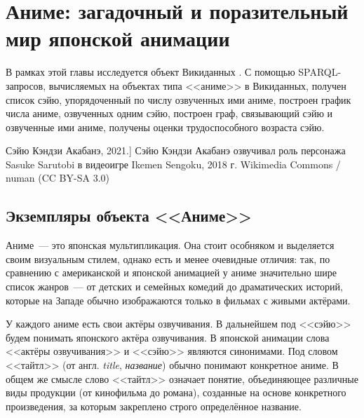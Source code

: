 
\chapter{Аниме: загадочный и поразительный мир японской анимации}


В рамках этой главы исследуется объект Викиданных . С помощью SPARQL-запросов, вычисляемых на объектах типа <<аниме>> в Викиданных, получен список сэйю, упорядоченный по числу озвученных ими аниме, построен график числа аниме, озвученных одним сэйю, построен граф, связывающий сэйю и озвученные ими аниме, получены оценки трудоспособного возраста сэйю. 

\begin{marginfigure}[0.0cm]
{
	\setlength{\fboxsep}{0pt}%
	\setlength{\fboxrule}{1pt}%
}
\caption
[Сэйю Кэндзи Акабанэ, 2021.]
{
Сэйю Кэндзи Акабанэ озвучивал роль персонажа Sasuke Sarutobi в видеоигре Ikemen Sengoku, 2018 г.\newline
Wikimedia Commons / numan (CC BY-SA 3.0)
}
\label{fig:seiyu}
\end{marginfigure}

\label{ch:anime}

\section{Экземпляры объекта <<Аниме>>}

Аниме~--- это японская мультипликация. Она стоит особняком и выделяется своим визуальным стилем, однако есть и менее очевидные отличия: так, по сравнению с американской и японской анимацией у аниме значительно шире список жанров~--- от детских и семейных комедий до драматических историй, которые на Западе обычно изображаются только в фильмах с живыми актёрами\autocite{anime_vs_animation}.

У каждого аниме есть свои актёры озвучивания. В дальнейшем под <<сэйю>> будем понимать японского актёра озвучивания. В японской анимации слова <<актёры озвучивания>> и <<сэйю>> являются синонимами\autocite{shikimori}. Под словом <<тайтл>> (от англ. \emph{title}, \emph{название}) обычно понимают конкретное аниме\autocite{anime_social}. В общем же смысле слово <<тайтл>> означает понятие, объединяющее различные виды продукции (от кинофильма до романа), созданные на основе конкретного произведения, за которым закреплено строго определённое название\autocite{anime_title_def}.

